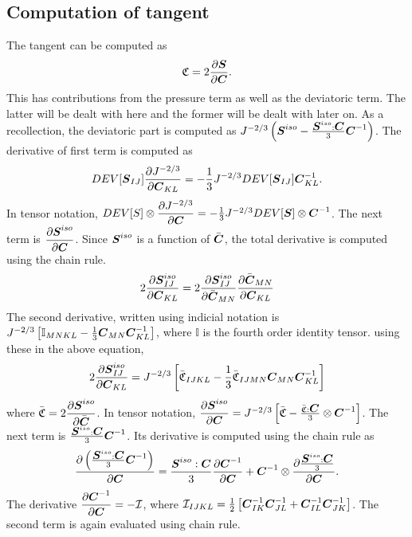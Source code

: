 \documentclass[11pt,twoside,TimesRoman]{article}
\newcommand{\parder}[2]{{\dfrac{\partial #1}{\partial #2}}}
\begin{document}
\subsection{Computation of tangent}
The tangent can be computed as 
\begin{equation}
	\mathfrak{C} = 2 \parder{\bfS}{\bfC}.
\end{equation}
This has contributions from the pressure term as well as the deviatoric term. The latter will be dealt with here and the former will be dealt with later on. As a recollection, the deviatoric part is computed as $J^{-2/3} \left(\mbox{\boldmath $S$}^{iso}-\frac{\mbox{\boldmath $S$}^{iso}:\mbox{\boldmath $C$}}{3}\mbox{\boldmath $C$}^{-1} \right)$. The derivative of first term is computed as 
\begin{equation}
DEV[\bfS_{IJ}] \parder{J^{-2/3}}{\bfC_{KL}}= -\frac{1}{3} J^{-2/3} DEV[\bfS_{IJ}] {\bfC^{-1}_{KL}}.
\end{equation}
In tensor notation, $DEV[S] \otimes \parder{J^{-2/3}}{\bfC} = -\frac{1}{3} J^{-2/3} DEV[\bfS]  \otimes {\bfC^{-1}}$. The next term is $\parder{\bfS^{iso}}{\bfC}$. Since $\mbox{\boldmath $S$}^{iso}$ is a function of $\bar{\mbox{\boldmath $C$}}$, the total derivative is computed using the chain rule.
\begin{equation}
 2\parder{\bfS^{iso}_{IJ}}{\bfC_{KL}} =  2\parder{\bfS^{iso}_{IJ}}{\bar{\bfC}_{MN}} \parder{\bar{\bfC}_{MN}}{{\bfC}_{KL}}
\end{equation}
The second derivative, written using indicial notation is $J^{-2/3}\left[\mathbb{I}_{MNKL}- \frac{1}{3} \mbox{\boldmath $C$}_{MN} \mbox{\boldmath $C$}^{-1}_{KL}   \right]$, where $\mathbb{I}$ is the fourth order identity tensor. using these in the above equation,
\begin{equation}
2\parder{\bfS^{iso}_{IJ}}{\bfC_{KL}} =  J^{-2/3}\left[\bar{\mathfrak{C}}_{IJKL}- \frac{1}{3} \bar{\mathfrak{C}}_{IJMN} \bfC_{MN} \bfC^{-1}_{KL} \right]  
\end{equation}
where $\bar{\mathfrak{C}} = 2\parder{\bfS^{iso}}{\bfCbar}$. In tensor notation, $\parder{\bfS^{iso}}{\bfC} = J^{-2/3}\left[\bar{\mathfrak{C}}- \frac{\bar{\mathfrak{C}}: \bfC}{3}  \otimes \bfC^{-1} \right]$. The next term is $\frac{\mbox{\boldmath $S$}^{iso}:\mbox{\boldmath $C$}}{3}\mbox{\boldmath $C$}^{-1}$. Its derivative is computed using the chain rule as
\begin{equation}
	\parder{\left( \frac{\bfS^{iso}:\bfC}{3}\bfC^{-1} \right)}{\bfC} = \frac{\bfS^{iso}:\bfC}{3} \parder{\bfCinv}{\bfC} + \bfCinv \otimes \parder{\frac{\bfS^{iso}:\bfC}{3}}{\bfC}.
\end{equation} 
The derivative $\parder{\bfCinv}{\bfC} = -\mathcal{I}$, where $\mathcal{I}_{IJKL} = \frac{1}{2} \left[ {\mbox{\boldmath $C$}}^{-1}_{IK} {\mbox{\boldmath $C$}}^{-1}_{JL} + {\mbox{\boldmath $C$}}^{-1}_{IL} {\mbox{\boldmath $C$}}^{-1}_{JK} \right] $. The second term is again evaluated using chain rule.
\end{document}
